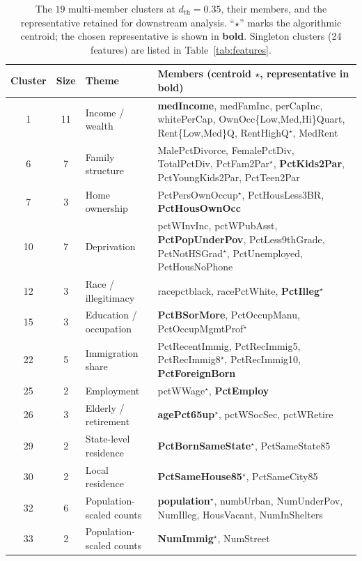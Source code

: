 \documentclass{ieeeaccess}
\begin{document}
\begin{table}[!t]
\caption{The $19$ multi-member clusters at $d_{\mathrm{th}}=0.35$, their members, and the representative retained for downstream analysis. ``$\star$'' marks the algorithmic centroid; the chosen representative is shown in \textbf{bold}. Singleton clusters (24 features) are listed in Table~\ref{tab:features}.}
\label{tab:clusters}
\centering
\footnotesize
\begin{tabular}{cclp{8.0cm}}
\toprule
Cluster & Size & Theme & Members (centroid $\star$, representative in \textbf{bold}) \\
\midrule
 1 & 11 & Income / wealth          & \textbf{medIncome}, medFamInc, perCapInc, whitePerCap, OwnOcc\{Low,Med,Hi\}Quart, Rent\{Low,Med\}Q, RentHighQ$^\star$, MedRent \\
 6 &  7 & Family structure         & MalePctDivorce, FemalePctDiv, TotalPctDiv, PctFam2Par$^\star$, \textbf{PctKids2Par}, PctYoungKids2Par, PctTeen2Par \\
 7 &  3 & Home ownership           & PctPersOwnOccup$^\star$, PctHousLess3BR, \textbf{PctHousOwnOcc} \\
10 &  7 & Deprivation              & pctWInvInc, pctWPubAsst, \textbf{PctPopUnderPov}, PctLess9thGrade, PctNotHSGrad$^\star$, PctUnemployed, PctHousNoPhone \\
12 &  3 & Race / illegitimacy      & racepctblack, racePctWhite, \textbf{PctIlleg}$^\star$ \\
15 &  3 & Education / occupation   & \textbf{PctBSorMore}, PctOccupManu, PctOccupMgmtProf$^\star$ \\
22 &  5 & Immigration share        & PctRecentImmig, PctRecImmig5, PctRecImmig8$^\star$, PctRecImmig10, \textbf{PctForeignBorn} \\
25 &  2 & Employment               & pctWWage$^\star$, \textbf{PctEmploy} \\
26 &  3 & Elderly / retirement     & \textbf{agePct65up}$^\star$, pctWSocSec, pctWRetire \\
29 &  2 & State-level residence    & \textbf{PctBornSameState}$^\star$, PctSameState85 \\
30 &  2 & Local residence          & \textbf{PctSameHouse85}$^\star$, PctSameCity85 \\
32 &  6 & Population-scaled counts & \textbf{population}$^\star$, numbUrban, NumUnderPov, NumIlleg, HousVacant, NumInShelters \\
33 &  2 & Population-scaled counts & \textbf{NumImmig}$^\star$, NumStreet \\

\end{tabular}
\end{table}
\end{document}
